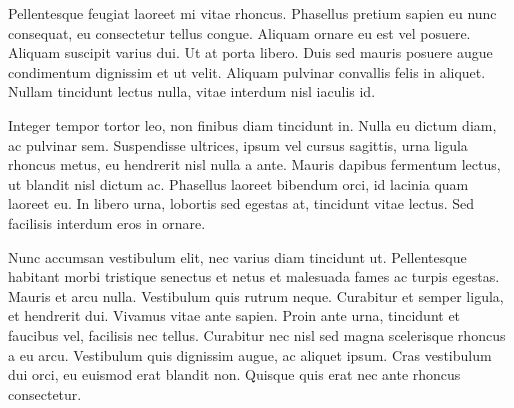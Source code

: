 Pellentesque feugiat laoreet mi vitae rhoncus. Phasellus pretium sapien eu nunc
consequat, eu consectetur tellus congue. Aliquam ornare eu est vel posuere.
Aliquam suscipit varius dui. Ut at porta libero. Duis sed mauris posuere augue
condimentum dignissim et ut velit. Aliquam pulvinar convallis felis in aliquet.
Nullam tincidunt lectus nulla, vitae interdum nisl iaculis id.

Integer tempor tortor leo, non finibus diam tincidunt in. Nulla eu dictum diam,
ac pulvinar sem. Suspendisse ultrices, ipsum vel cursus sagittis, urna ligula
rhoncus metus, eu hendrerit nisl nulla a ante. Mauris dapibus fermentum lectus,
ut blandit nisl dictum ac. Phasellus laoreet bibendum orci, id lacinia quam
laoreet eu. In libero urna, lobortis sed egestas at, tincidunt vitae lectus. Sed
facilisis interdum eros in ornare.

Nunc accumsan vestibulum elit, nec varius diam tincidunt ut. Pellentesque
habitant morbi tristique senectus et netus et malesuada fames ac turpis egestas.
Mauris et arcu nulla. Vestibulum quis rutrum neque. Curabitur et semper ligula,
et hendrerit dui. Vivamus vitae ante sapien. Proin ante urna, tincidunt et
faucibus vel, facilisis nec tellus. Curabitur nec nisl sed magna scelerisque
rhoncus a eu arcu. Vestibulum quis dignissim augue, ac aliquet ipsum. Cras
vestibulum dui orci, eu euismod erat blandit non. Quisque quis erat nec ante
rhoncus consectetur. 
